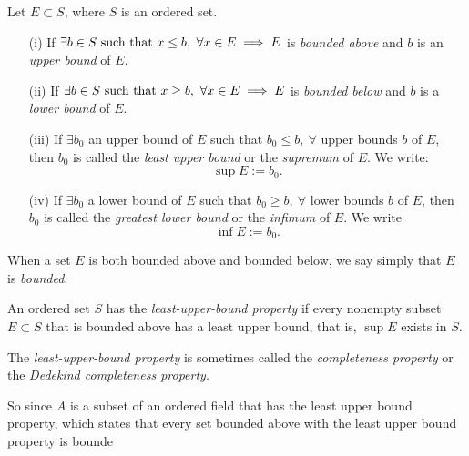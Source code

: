 \documentclass[../main.tex]{subfiles}
\begin{document}
\begin{definition} \label{def:bounded_set}
Let \( E \subset S \), where \( S \) is an ordered set.
\begin{itemize}
    \item[(i)] If \( \exists b \in S \textnormal{ such that } x \leq b, \ \forall x \in E \implies E \) is \textit{bounded above} and \( b \) is an \textit{upper bound} of \( E \).
    \item[(ii)] If \( \exists b \in S \textnormal{ such that } x \geq b, \ \forall x \in E \implies E \) is \textit{bounded below} and \( b \) is a \textit{lower bound} of \( E \).
    \item[(iii)] If \( \exists b_0 \) an upper bound of \( E \) such that \( b_0 \leq b, \ \forall \) upper bounds \( b \) of \( E \), then \( b_0 \) is called the \textit{least upper bound} or the \textit{supremum} of \( E \). We write:
    \[
    \sup E := b_0.
    \]
    \item[(iv)] If \( \exists b_0 \) a lower bound of \( E \) such that \( b_0 \geq b, \ \forall \) lower bounds \( b \) of \( E \), then \( b_0 \) is called the \textit{greatest lower bound} or the \textit{infimum} of \( E \). We write
    \[
    \inf E := b_0.
    \]
\end{itemize}
When a set \( E \) is both bounded above and bounded below, we say simply that \( E \) is \textit{bounded}.
\end{definition}













\begin{definition}\label{def:lub_property}
An ordered set $S$ has the \textit{least-upper-bound property} if every nonempty subset $ E \subset S$ that is bounded above has a least upper bound, that is, $ \sup E$ exists in $S$.
\begin{center}
    The \textit{least-upper-bound property} is sometimes called the \textit{completeness property} or the \textit{Dedekind completeness property}.
\end{center}
    
\end{definition}







\begin{remark}
So since $A$ is a subset of an ordered field that has the least upper bound property, which states that every set bounded above with the least upper bound property is bounde
\end{remark}
\end{document}
